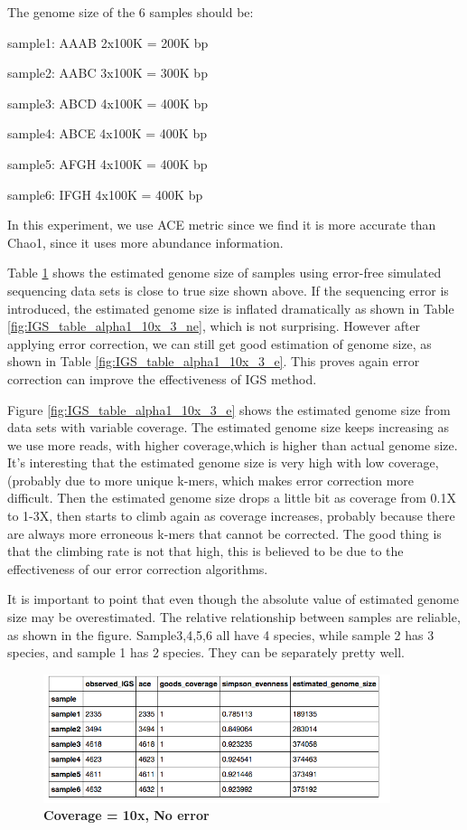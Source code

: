 The genome size of the 6 samples should be:

sample1: AAAB 2x100K = 200K bp

sample2: AABC 3x100K = 300K bp

sample3: ABCD 4x100K = 400K bp

sample4: ABCE 4x100K = 400K bp

sample5: AFGH 4x100K = 400K bp

sample6: IFGH 4x100K = 400K bp

In this experiment, we use ACE metric since we find it is more accurate than Chao1, since it uses more abundance information.

Table \ref{fig:IGS_table_alpha1_10x_0} shows the estimated genome size of samples using error-free simulated sequencing data sets
is close to true size shown above. If the sequencing error is introduced, the estimated genome size is inflated dramatically as shown in Table \ref{fig:IGS_table_alpha1_10x_3_ne}, which is 
not surprising. However after applying error correction, we can still get good estimation of genome size, as shown in Table \ref{fig:IGS_table_alpha1_10x_3_e}.
This proves again error correction can improve the effectiveness of IGS method.


Figure \ref{fig:IGS_table_alpha1_10x_3_e} shows the estimated genome size from data sets with variable coverage.
The estimated genome size keeps increasing as we use more reads, with higher coverage,which is  higher than actual genome size.
It's interesting that the estimated genome size is very high with low coverage, (probably due to more unique k-mers, which makes error correction more difficult. Then the estimated genome size drops a little bit as coverage from 0.1X to 1-3X, then starts to climb again as coverage increases, probably because there are always more erroneous k-mers that cannot be corrected. The good thing is that the climbing rate is not that high, this is believed to be due to the effectiveness of our error correction algorithms.

It is important to point that even though the absolute value of estimated genome size may be overestimated. The relative relationship between samples are reliable, as shown in the figure. Sample3,4,5,6 all have 4 species, while sample 2 has 3 species, and sample 1 has 2 species. They can be separately pretty well.


\begin{figure}[!ht]
 \centerline{\includegraphics[width=4in]{./figures/IGS_table_alpha1_10x_0.png}}
\caption{\bf Coverage = 10x, No error}
\label{fig:IGS_table_alpha1_10x_0}
\end{figure}


